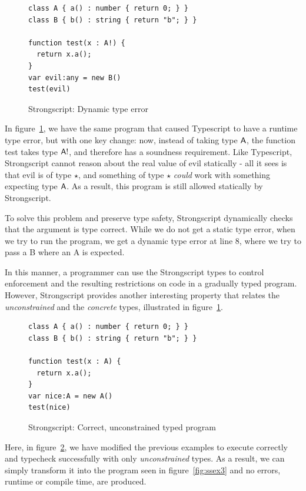 \documentclass[preprint]{sigplanconf}
\newcommand{\any}{\M{\star}}
\newcommand{\M}[1]{\ensuremath{#1}\xspace}
\newcommand{\xt}[1]{{\sf{#1}}\xspace}
\begin{document}
\begin{figure}[h]
\begin{verbatim}
class A { a() : number { return 0; } }
class B { b() : string { return "b"; } }

function test(x : A!) {
  return x.a();
}
var evil:any = new B()
test(evil)
\end{verbatim}
\caption{Strongscript: Dynamic type error}
\label{fig:ssex}
\end{figure}

In figure~\ref{fig:ssex}, we have the same program that caused Typescript
to have a runtime type error, but with one key change: now, instead of taking type
$\xt{A}$, the function test takes type $\xt{A!}$, and therefore has a soundness
requirement. Like Typescript, Strongscript cannot reason about the real value of
evil statically - all it sees is that evil is of type $\any$, and something of type
$\any$ \emph{could} work with something expecting type $\xt{A}$. As a result, this
program is still allowed statically by Strongscript.

To solve this problem and preserve type safety, Strongscript dynamically checks that the argument
is type correct. While we do not get a static type error, when we try to 
run the program, we get a dynamic type error at line 8, where we try to 
pass a B where an A is expected. 

In this manner, a programmer can use the Strongscript types to control enforcement
and the resulting restrictions on code in a gradually typed program. However,
Strongscript provides another interesting property that relates the \emph{unconstrained}
and the \emph{concrete} types, illustrated in figure~\ref{fig:ssex}.

\begin{figure}[h]
\begin{verbatim}
class A { a() : number { return 0; } }
class B { b() : string { return "b"; } }

function test(x : A) {
  return x.a();
}
var nice:A = new A()
test(nice)
\end{verbatim}
\caption{Strongscript: Correct, unconstrained typed program}
\label{fig:ssex2}
\end{figure}

Here, in figure~\ref{fig:ssex2}, we have modified the previous examples to execute correctly and typecheck
successfully with only \emph{unconstrained} types. As a result, we can simply 
transform it into the program seen in figure~\ref{fig:ssex3} and no errors, runtime
or compile time, are produced.
\end{document}

